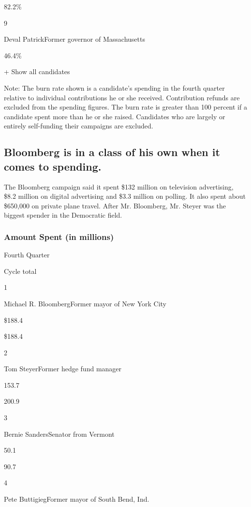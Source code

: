 82.2\%

9

Deval PatrickFormer governor of Massachusetts

46.4\%

+ Show all candidates

Note: The burn rate shown is a candidate's spending in the fourth
quarter relative to individual contributions he or she received.
Contribution refunds are excluded from the spending figures. The burn
rate is greater than 100 percent if a candidate spent more than he or
she raised. Candidates who are largely or entirely self-funding their
campaigns are excluded.

\hypertarget{bloomberg-is-in-a-class-of-his-own-when-it-comes-to-spending}{%
\subsection{Bloomberg is in a class of his own when it comes to
spending.}\label{bloomberg-is-in-a-class-of-his-own-when-it-comes-to-spending}}

The Bloomberg campaign said it spent \$132 million on television
advertising, \$8.2 million on digital advertising and \$3.3 million on
polling. It also spent about \$650,000 on private plane travel. After
Mr. Bloomberg, Mr. Steyer was the biggest spender in the Democratic
field.

\hypertarget{amount-spent-in-millions}{%
\subsubsection{Amount Spent (in
millions)}\label{amount-spent-in-millions}}

Fourth Quarter

Cycle total

1

Michael R. BloombergFormer mayor of New York City

\$188.4

\$188.4

2

Tom SteyerFormer hedge fund manager

153.7

200.9

3

Bernie SandersSenator from Vermont

50.1

90.7

4

Pete ButtigiegFormer mayor of South Bend, Ind.

